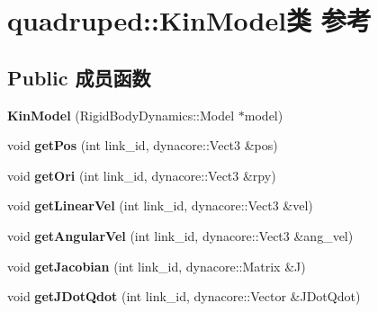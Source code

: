 \hypertarget{classquadruped_1_1KinModel}{}\section{quadruped\+:\+:Kin\+Model类 参考}
\label{classquadruped_1_1KinModel}
\subsection*{Public 成员函数}
\begin{DoxyCompactItemize}
\item 
\mbox{\label{classquadruped_1_1KinModel_a48cec7c90d4d2d49e84ca9fcc119e509}} 
{\bfseries Kin\+Model} (Rigid\+Body\+Dynamics\+::\+Model $\ast$model)
\item 
\mbox{\label{classquadruped_1_1KinModel_a40a0a563a135087742a0d387b31c0f6c}} 
void {\bfseries get\+Pos} (int link\+\_\+id, dynacore\+::\+Vect3 \&pos)
\item 
\mbox{\label{classquadruped_1_1KinModel_aeefc583e956d96d681a8627705628f56}} 
void {\bfseries get\+Ori} (int link\+\_\+id, dynacore\+::\+Vect3 \&rpy)
\item 
\mbox{\label{classquadruped_1_1KinModel_aebe2419f9e178a4ffa0fb77dae2634cb}} 
void {\bfseries get\+Linear\+Vel} (int link\+\_\+id, dynacore\+::\+Vect3 \&vel)
\item 
\mbox{\label{classquadruped_1_1KinModel_a9bd700110c74e15854b6b43facb3cc7d}} 
void {\bfseries get\+Angular\+Vel} (int link\+\_\+id, dynacore\+::\+Vect3 \&ang\+\_\+vel)
\item 
\mbox{\label{classquadruped_1_1KinModel_abe11f12a6caac107d27b87e860e8b658}} 
void {\bfseries get\+Jacobian} (int link\+\_\+id, dynacore\+::\+Matrix \&J)
\item 
\mbox{\label{classquadruped_1_1KinModel_a34d6bc52e8c03ff9d4e615221bd6d54f}} 
void {\bfseries get\+J\+Dot\+Qdot} (int link\+\_\+id, dynacore\+::\+Vector \&J\+Dot\+Qdot)
\item 
\mbox{\label{classquadruped_1_1KinModel_a7cecc8108a04e9decbad378e60aef654}} 

\end{DoxyCompactItemize}
